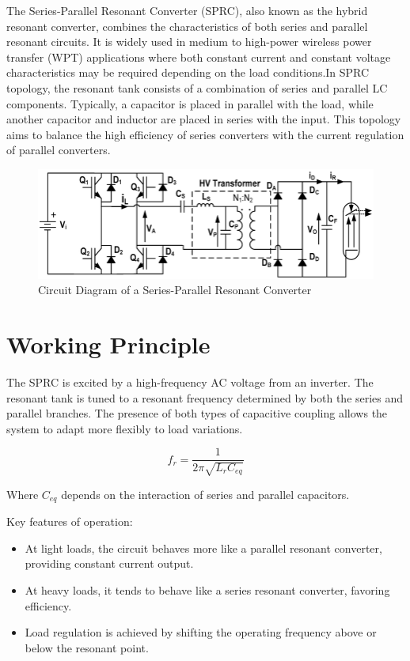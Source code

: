 \documentclass[12pt,a4paper]{report}
\begin{document}
\quad The Series-Parallel Resonant Converter (SPRC), also known as the hybrid resonant converter, combines the characteristics of both series and parallel resonant circuits. It is widely used in medium to high-power wireless power transfer (WPT) applications where both constant current and constant voltage characteristics may be required depending on the load conditions.In SPRC topology, the resonant tank consists of a combination of series and parallel LC components. Typically, a capacitor is placed in parallel with the load, while another capacitor and inductor are placed in series with the input. This topology aims to balance the high efficiency of series converters with the current regulation of parallel converters.\cite{irivennela2020wireless}\cite{li2022singleended}


\begin{figure}
        \centering
        \includegraphics[width=0.65\linewidth]{image00.png}
       
        \caption{Circuit Diagram of a Series-Parallel Resonant Converter}
\end{figure}

\section{Working Principle}

\quad The SPRC is excited by a high-frequency AC voltage from an inverter. The resonant tank is tuned to a resonant frequency determined by both the series and parallel branches. The presence of both types of capacitive coupling allows the system to adapt more flexibly to load variations.\cite{choi2020resonant}

\[
f_r = \frac{1}{2\pi \sqrt{L_r C_{eq}}}
\]

\quad Where \(C_{eq}\) depends on the interaction of series and parallel capacitors.

\quad Key features of operation:

\begin{itemize}
    \item At light loads, the circuit behaves more like a parallel resonant converter, providing constant current output.
    \item At heavy loads, it tends to behave like a series resonant converter, favoring efficiency.
    \item Load regulation is achieved by shifting the operating frequency above or below the resonant point.
\end{itemize}
\end{document}
